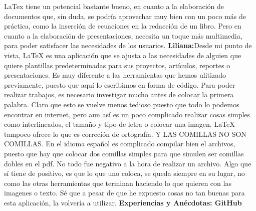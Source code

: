 \documentclass[12pt]{report}
\begin{document}
\newline
\newline
LaTex tiene un potencial bastante bueno, en cuanto a la elaboración de documentos que, sin duda, se podría aprovechar muy bien con un poco más de práctica, como la inserción de ecuaciones en la redacción de un libro. Pero en cuanto a la elaboración de presentaciones, necesita un toque más multimedia, para poder satisfacer las necesidades de los usuarios.
\newline
\newline
\textbf{Liliana:\newline\newline}Desde mi punto de vista, LaTeX es una aplicación que se ajusta a las necesidades de alguien que quiere plantillas predeterminadas para sus proyectos, artículos, reportes o presentaciones. Es muy diferente a las herramientas que hemos ulitizado previamente, puesto que aquí lo escribimos en forma de código.
\newline
\newline
Para poder realizar trabajos, es necesario investigar mucho antes de colocar la primera palabra. Claro que esto se vuelve menos tedioso puesto que todo lo podemos encontrar en internet, pero aun así es un poco complicado realizar cosas simples como interlineados, el tamaño y tipo de letra o colocar una imagen.
\newline
\newline
LaTeX tampoco ofrece lo que es correción de ortografía. Y LAS COMILLAS NO SON COMILLAS. En el idioma español es complicado compilar bien el archivos, puesto que hay que colocar dos comillas simples para que simulen ser comillas dobles en el pdf.
\newline
\newline
No todo fue negativo a la hora de realizar un archivo. Algo que sí tiene de positivo, es que lo que uno coloca, se queda siempre en su lugar, no como las otras herramientas que terminan haciendo lo que quieren con las imagenes o texto.
\newline
\newline
Sé que a pesar de que he expuesto cosas no tan buenas para esta aplicación, la volvería a utilizar.
\newline
\newline
	\begingroup
		\large{
			\textbf{
			           \newline
			           \newline
				Experiencias y Anécdotas: GitHub
				\newline
				\newline
			}
		}
\end{document}
